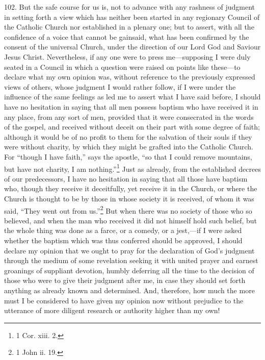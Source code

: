102. But the safe course for us is, not to advance with any rashness of judgment in setting forth a view which has neither been started in any regionary Council of the Catholic Church nor established in a plenary one; but to assert, with all the confidence of a voice that cannot be gainsaid, what has been confirmed by the consent of the universal Church, under the direction of our Lord God and Saviour Jesus Christ. Nevertheless, if any one were to press me—supposing I were duly seated in a Council in which a question were raised on points like these—to declare what my own opinion was, without reference to the previously expressed views of others, whose judgment I would rather follow, if I were under the influence of the same feelings as led me to assert what I have said before, I should have no hesitation in saying that all men possess baptism who have received it in any place, from any sort of men, provided that it were consecrated in the words of the gospel, and received without deceit on their part with some degree of faith; although it would be of no profit to them for the salvation of their souls if they were without charity, by which they might be grafted into the Catholic Church. For ``though I have faith,'' says the apostle, ``so that I could remove mountains, but have not charity, I am nothing.''\footnote{\par  1 Cor. xiii. 2.} Just as already, from the established decrees of our predecessors, I have no hesitation in saying that all those have baptism who, though they receive it deceitfully, yet receive it in the Church, or where the Church is thought to be by those in whose society it is received, of whom it was said, ``They went out from us.''\footnote{\par  1 John ii. 19.} But when there was no society of those who so believed, and when the man who received it did not himself hold such belief, but the whole thing was done as a farce, or a comedy, or a jest,—if I were asked whether the baptism which was thus conferred should be approved, I should declare my opinion that we ought to pray for the declaration of God’s judgment through the medium of some revelation seeking it with united prayer and earnest groanings of suppliant devotion, humbly deferring all the time to the decision of those who were to give their judgment after me, in case they should set forth anything as already known and determined. And, therefore, how much the more must I be considered to have given my opinion now without prejudice to the utterance of more diligent research or authority higher than my own!

